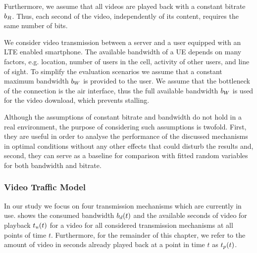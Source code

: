 Furthermore, we assume that all videos are played back with a constant bitrate \(b_R\).
Thus, each second of the video, independently of its content, requires the same number of bits.

We consider video transmission between a server and a user equipped with an \gls{LTE} enabled smartphone.
The available bandwidth of a \gls{UE} depends on many factors, e.g. location, number of users in the cell, activity of other users, and line of sight.
To simplify the evaluation scenarios we assume that a constant maximum bandwidth \(b_W\) is provided to the user.
We assume that the bottleneck of the connection is the air interface, thus the full available bandwidth \(b_W\)  is used for the video download, which prevents stalling.

Although the assumptions of constant bitrate and bandwidth do not hold in a real environment, the purpose of considering such assumptions is twofold.
First, they are useful in order to analyse the performance of the discussed mechanisms in optimal conditions without any other effects that could disturb the results and, second, they can serve as a baseline for comparison with fitted random variables for both bandwidth and bitrate.

\subsubsection*{Video Traffic Model}\label{sec:application:lte_video:system_model:video_traffic}

In our study we focus on four transmission mechanisms which are currently in use.
 shows the consumed bandwidth \(b_d(t)\) and the available seconds of video for playback \(t_u(t)\) for a video for all considered transmission mechanisms at all points of time \(t\).
Furthermore, for the remainder of this chapter, we refer to the amount of video in seconds already played back at a point in time \(t\) as \(t_p(t)\).

